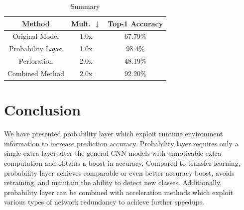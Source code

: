 \documentclass{article}
\begin{document}



\begin{table}[h]
    \caption{Summary}
    \label{tab:my_label}

    \centering
    \begin{tabular}{ ccc } 
     Method & Mult. $\downarrow$ & Top-1 Accuracy \\ 
     \hline
     Original Model & 1.0x & 67.79\% \\
     Probability Layer & 1.0x & 98.4\% \\ 
     Perforation & 2.0x & 48.19\% \\ 
     \hline
     Combined Method & 2.0x & 92.20\%
    \end{tabular}
\end{table}




\section{Conclusion}
We have presented probability layer which exploit runtime environment information to increase prediction accuracy. Probability layer requires only a single extra layer after the general CNN models with unnoticable extra computation and obtains a boost in accuracy. Compared to transfer learning, probability layer achieves comparable or even better accuracy boost, avoids retraining, and maintain the ability to detect new classes. Additionally, probability layer can be combined with acceleration methods which exploit various types of network redundancy to achieve further speedups.







\end{document}
